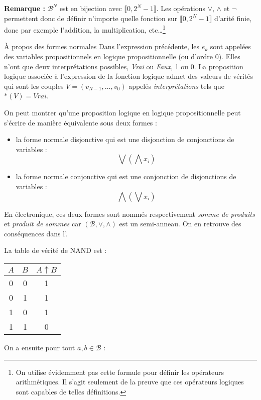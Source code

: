\documentclass[../main.tex]{subfiles}
\begin{document}
\textbf{Remarque : }$\mathcal{B}^{N}$ est en bijection avec $\llbracket 0, 2^{N}-1\rrbracket$. Les opérations $\vee$, $\wedge$ et $\neg$ permettent donc de définir n'importe quelle fonction sur $\llbracket 0, 2^{N}-1\rrbracket$ d'arité finie, donc par exemple l'addition, la multiplication, etc\dots\footnote{On utilise évidemment pas cette formule pour définir les opérateurs arithmétiques. Il s'agit seulement de la preuve que ces opérateurs logiques sont capables de telles définitions.}
\begin{minitelbasicbox}{À propos des formes normales}
Dans l'expression précédente, les $e_{k}$ sont appelées des variables propositionnels en logique propositionnelle (ou d'ordre 0). Elles n'ont que deux interprétations possibles, \textit{Vrai} ou \textit{Faux}, 1 ou 0. La proposition logique associée à l'expression de la fonction logique admet des valeurs de vérités qui sont les couples $V = (v_{N-1}, \dots, v_{0})$ appelés \textit{interprétations} tels que $\ast(V) = Vrai$.

On peut montrer qu'une proposition logique en logique propositionnelle peut s'écrire de manière équivalente sous deux formes :
\begin{itemize}
	\item la forme normale disjonctive qui est une disjonction de conjonctions de variables :
	$$\displaystyle\bigvee\left(\displaystyle\bigwedge x_{i}\right)$$
	\item la forme normale conjonctive qui est une conjonction de disjonctions de variables :
	$$\displaystyle\bigwedge\left(\displaystyle\bigvee x_{i}\right)$$
\end{itemize}
En électronique, ces deux formes sont nommés respectivement \textit{somme de produits} et \textit{produit de sommes} car $(\mathcal{B}, \vee, \wedge)$ est un semi-anneau. On en retrouve des conséquences dans l'.
\end{minitelbasicbox}
La table de vérité de NAND est :
\begin{center}
\begin{tabular}{c|c|c}
$A$ & $B$ & $A\uparrow{B}$ \\
\hline
0 & 0 & 1 \\
0 & 1 & 1 \\
1 & 0 & 1 \\
1 & 1 & 0 \\
\end{tabular}
\end{center}
On a ensuite pour tout $a, b\in{\mathcal{B}}$ :
\end{document}
